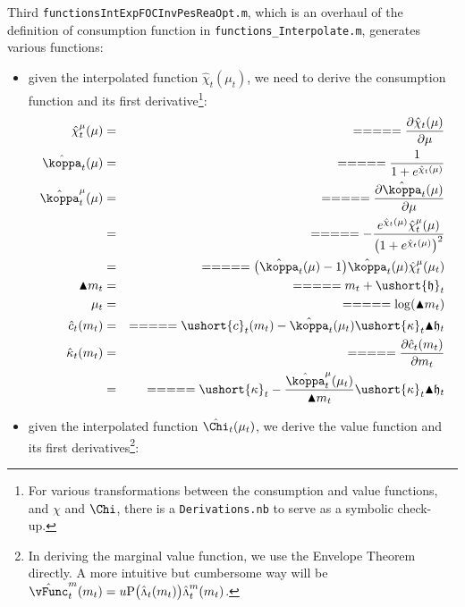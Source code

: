 \documentclass[titlepage,abstract]{\econtex}
\providecommand{\vInv}{\ensuremath{\scriptstyle \Lambda \displaystyle}}
\begin{document}
Third \texttt{functionsIntExpFOCInvPesReaOpt.m}, which is an overhaul of the definition of consumption function in \texttt{functions\_Interpolate.m}, generates various functions:
\begin{itemize}
        \item given the interpolated function $\hat{\chi}_{t}(\mu_{t})$, we need to derive the consumption function and its first derivative\footnote{For various transformations between the consumption and value functions, and $\chi$ and $\Chi$, there is a \texttt{Derivations.nb} to serve as a symbolic check-up.}:
            \begin{equation}\begin{gathered}\begin{aligned}
            \hat{\chi}^{\mu}_{t}(\mu)      &=& =  =  =  =  =  \frac{\partial \hat{\chi}_{t}(\mu)}{\partial \mu} \\
            \hat{\koppa}_{t} (\mu)      &=& =  =  =  =  = \frac{1}{1+e^{\hat{\chi}_{t}(\mu)}} \\
            \hat{\koppa}^{\mu}_{t} (\mu)      &=& =  =  =  =  =  \frac{\partial \hat{\koppa}_{t} (\mu)}{\partial \mu} \\
                 &=& =  =  =  =  =  -\frac{e^{\hat{\chi}_{t}(\mu)} \hat{\chi}^{\mu}_{t}(\mu)}{\big(1+e^{\hat{\chi}_{t}(\mu)}\big)^{2}} \\
                 &=& =  =  =  =  =  \big(\hat{\koppa}_{t} (\mu)-1\big)\hat{\koppa}_{t} (\mu) \hat{\chi}^{\mu}_{t}(\mu_{t}) \\
            \blacktriangle m_{t}      &=& =  =  =  =  =  m_{t} + \ushort{\mathfrak{h}}_{t} \\
            \mu_{t}      &=& =  =  =  =  =  \log(\blacktriangle m_{t}) \\
            \hat{c}_{t}(m_{t})      &=& =  =  =  =  =  \ushort{c}_{t}(m_{t})-\hat{\koppa}_{t}(\mu_{t}) \ushort{\kappa}_{t} \blacktriangle \mathfrak{h}_{t} \\
            \hat{\kappa}_{t}(m_{t})      &=& =  =  =  =  =  \frac{\partial \hat{c}_{t}(m_{t})}{\partial m_{t}} \\
                 &=& =  =  =  =  =  \ushort{\kappa}_{t}-\frac{\hat{\koppa}^{\mu}_{t}(\mu_{t})}{\blacktriangle m_{t}} \ushort{\kappa}_{t} \blacktriangle \mathfrak{h}_{t} \\
            \end{aligned}\end{gathered}\end{equation}
        \item given the interpolated function $\hat{\Chi}_{t}(\mu_{t})$, we derive the value function and its first derivatives\footnote{In deriving the marginal value function, we use the Envelope Theorem directly. A more intuitive but cumbersome way will be $\hat{\vFunc}_{t}^{m} (m_{t}) = u\text{P}\big(\hat{\vInv}_{t}(m_{t})\big) \hat{\vInv}_{t}^{m} (m_{t})$.}:

\end{itemize}
\end{document}
